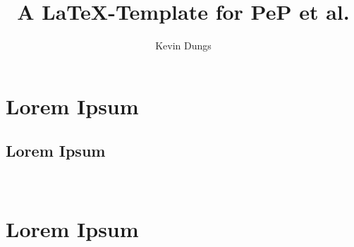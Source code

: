 \documentclass[a4paper,twocolumn]{scrartcl}
\author{Kevin Dungs}
\title{A \LaTeX-Template for PeP et al.}
\begin{document}
\maketitle

\section{Lorem Ipsum}
\lipsum
\subsection{Lorem Ipsum}
\lipsum~\cite{panda}
\section{Lorem Ipsum}
\lipsum

\printbibliography
\end{document}
